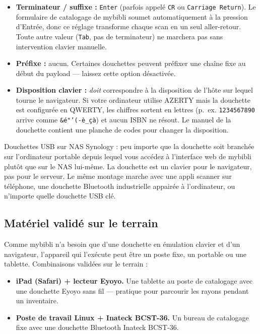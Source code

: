 \begin{itemize}
  \item \textbf{Terminateur / suffixe :} \texttt{Enter} (parfois
        appelé \texttt{CR} ou \texttt{Carriage Return}). Le
        formulaire de catalogage de mybibli soumet
        automatiquement à la pression d'Entrée, donc ce réglage
        transforme chaque scan en un seul aller-retour. Toute autre
        valeur (\texttt{Tab}, pas de terminateur) ne marchera pas
        sans intervention clavier manuelle.
  \item \textbf{Préfixe :} aucun. Certaines douchettes peuvent
        préfixer une chaîne fixe au début du payload — laissez
        cette option désactivée.
  \item \textbf{Disposition clavier :} \emph{doit} correspondre à
        la disposition de l'hôte sur lequel tourne le navigateur. Si
        votre ordinateur utilise AZERTY mais la douchette est
        configurée en QWERTY, les chiffres sortent en lettres (p.~ex.
        \texttt{1234567890} arrive comme \texttt{\&é"'(-è\_çà}) et
        aucun ISBN ne résout. Le manuel de la douchette contient une
        planche de codes pour changer la disposition.
\end{itemize}

\begin{tip}
Douchettes USB sur NAS Synology : peu importe que la douchette soit
branchée sur l'ordinateur portable depuis lequel vous accédez à
l'interface web de mybibli plutôt que sur le NAS lui-même. La
douchette est un clavier pour le navigateur, pas pour le serveur. Le
même montage marche avec une appli scanner sur téléphone, une
douchette Bluetooth industrielle appairée à l'ordinateur, ou
n'importe quelle douchette USB clé.
\end{tip}

\subsection*{Matériel validé sur le terrain}

Comme mybibli n'a besoin que d'une douchette en émulation clavier et
d'un navigateur, l'appareil qui l'exécute peut être un poste fixe, un
portable ou une tablette. Combinaisons validées sur le terrain :

\begin{itemize}
  \item \textbf{iPad (Safari) + lecteur Eyoyo.} Une tablette au poste
        de catalogage avec une douchette Eyoyo sans fil — pratique pour
        parcourir les rayons pendant un inventaire.
  \item \textbf{Poste de travail Linux + Inateck BCST-36.} Un bureau de
        catalogage fixe avec une douchette Bluetooth Inateck BCST-36.
\end{itemize}

